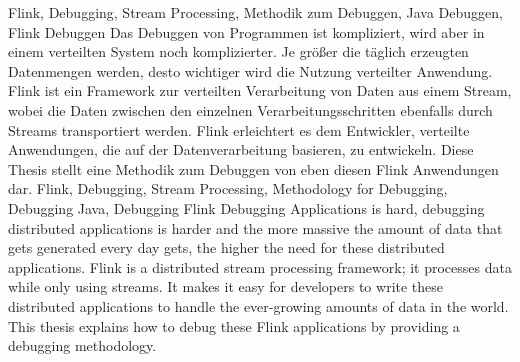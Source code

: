 \documentclass[draft=false
              ,paper=a4
              ,twoside=false
              ,fontsize=11pt
              ,headsepline
              ,BCOR10mm
              ,DIV11
              ]{scrbook}
\begin{document}

\frontmatter

\maketitle

\onehalfspacing

\HAWAbstractPage
{Flink, Debugging, Stream Processing, Methodik zum Debuggen, Java Debuggen, Flink Debuggen}%
{Das Debuggen von Programmen ist kompliziert, wird aber in einem verteilten System noch komplizierter. Je größer die täglich erzeugten Datenmengen werden, desto wichtiger wird die Nutzung verteilter Anwendung. Flink ist ein Framework zur verteilten Verarbeitung von Daten aus einem Stream, wobei die Daten zwischen den einzelnen Verarbeitungsschritten ebenfalls durch Streams transportiert werden. Flink erleichtert es dem Entwickler, verteilte Anwendungen, die auf der Datenverarbeitung basieren, zu entwickeln. Diese Thesis stellt eine Methodik zum Debuggen von eben diesen Flink Anwendungen dar.}
{Flink, Debugging, Stream Processing, Methodology for Debugging, Debugging Java, Debugging Flink}%
{Debugging Applications is hard, debugging distributed applications is harder and the more massive the amount of data that gets generated every day gets, the higher the need for these distributed applications. Flink is a distributed stream processing framework; it processes data while only using streams. It makes it easy for developers to write these distributed applications to handle the ever-growing amounts of data in the world. This thesis explains how to debug these Flink applications by providing a debugging methodology.}

\newpage
\singlespacing

\tableofcontents
\newpage
\lstlistoflistings
\listoffigures
\end{document}
